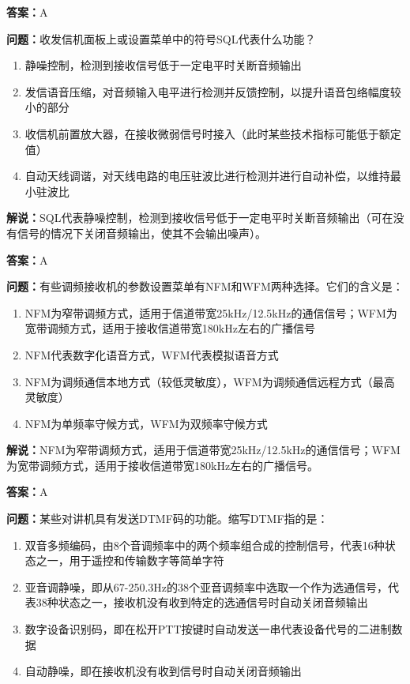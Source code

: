 \textbf{答案：}A

\textbf{问题：}收发信机面板上或设置菜单中的符号SQL代表什么功能？

\begin{enumerate}[label=\Alph*), leftmargin=3em]
	\item 静噪控制，检测到接收信号低于一定电平时关断音频输出
	\item 发信语音压缩，对音频输入电平进行检测并反馈控制，以提升语音包络幅度较小的部分
	\item 收信机前置放大器，在接收微弱信号时接入（此时某些技术指标可能低于额定值）
	\item 自动天线调谐，对天线电路的电压驻波比进行检测并进行自动补偿，以维持最小驻波比
\end{enumerate}

\textbf{解说：}SQL代表静噪控制，检测到接收信号低于一定电平时关断音频输出（可在没有信号的情况下关闭音频输出，使其不会输出噪声）。%

\textbf{答案：}A

\textbf{问题：}有些调频接收机的参数设置菜单有NFM和WFM两种选择。它们的含义是：

\begin{enumerate}[label=\Alph*), leftmargin=3em]
	\item NFM为窄带调频方式，适用于信道带宽25kHz/12.5kHz的通信信号；WFM为宽带调频方式，适用于接收信道带宽180kHz左右的广播信号
	\item NFM代表数字化语音方式，WFM代表模拟语音方式
	\item NFM为调频通信本地方式（较低灵敏度），WFM为调频通信远程方式（最高灵敏度）
	\item NFM为单频率守候方式，WFM为双频率守候方式
\end{enumerate}

\textbf{解说：}NFM为窄带调频方式，适用于信道带宽25kHz/12.5kHz的通信信号；WFM为宽带调频方式，适用于接收信道带宽180kHz左右的广播信号。%

\textbf{答案：}A

\textbf{问题：}某些对讲机具有发送DTMF码的功能。缩写DTMF指的是：

\begin{enumerate}[label=\Alph*), leftmargin=3em]
	\item 双音多频编码，由8个音调频率中的两个频率组合成的控制信号，代表16种状态之一，用于遥控和传输数字等简单字符
	\item 亚音调静噪，即从67-250.3Hz的38个亚音调频率中选取一个作为选通信号，代表38种状态之一，接收机没有收到特定的选通信号时自动关闭音频输出
	\item 数字设备识别码，即在松开PTT按键时自动发送一串代表设备代号的二进制数据
	\item 自动静噪，即在接收机没有收到信号时自动关闭音频输出
\end{enumerate}

